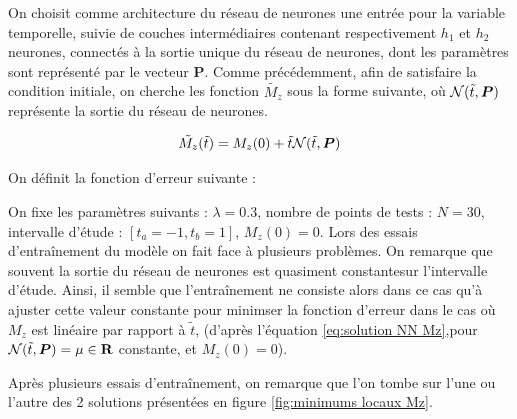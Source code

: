 \documentclass[12pt]{report}
\begin{document}
On choisit comme architecture du réseau de neurones une entrée pour la variable temporelle, suivie de couches intermédiaires contenant respectivement $h_1$ et $h_2$ neurones, connectés à la sortie unique du réseau de neurones, dont les paramètres sont représenté par le vecteur $\bm{P}$.
Comme précédemment, afin de satisfaire la condition initiale, on cherche les fonction $\tilde{M_z}$ sous la forme suivante, où ${\mathcal{N}}(\Tilde{t},\bm{P})$ représente la sortie du réseau de neurones.

\begin{equation}
    \Tilde{M_z}(\Tilde{t}) = M_z(0) +\Tilde{t} {\mathcal{N}}(\Tilde{t},\bm{P}) 
    \label{eq:solution NN Mz}
\end{equation}

On définit la fonction d'erreur suivante :


On fixe les paramètres suivants : $\lambda = 0.3$, nombre de points de tests : $N=30$, 
intervalle d'étude : $[t_a = -1, t_b = 1]$, $M_z(0) = 0$.
Lors des essais d'entraînement du modèle on fait face à plusieurs problèmes.
On remarque que souvent la sortie du réseau de neurones est quasiment constantesur l'intervalle d'étude. 
Ainsi, il semble que l'entraînement ne consiste alors dans ce cas qu'à ajuster cette valeur constante pour minimser la fonction d'erreur dans le cas où $M_z$ est linéaire par rapport à $\tilde{t}$, (d'après l'équation \ref{eq:solution NN Mz},pour ${\mathcal{N}}(\Tilde{t},\bm{P}) = \mu\in \mathbf{R}$ constante, et $M_z(0) = 0$).

Après plusieurs essais d'entraînement, on remarque que l'on tombe sur l'une ou l'autre des 2 solutions présentées en figure \ref{fig:minimums locaux Mz}.
\end{document}
